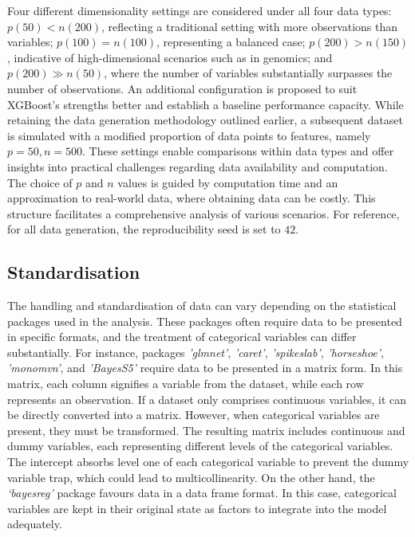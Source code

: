 \documentclass[
  11pt,
]{article}
\begin{document}
\hfill\break

Four different dimensionality settings are considered under all four
data types: \(p(50) < n(200)\), reflecting a traditional setting with
more observations than variables; \(p(100) = n(100)\), representing a
balanced case; \(p(200) > n(150)\), indicative of high-dimensional
scenarios such as in genomics; and \(p(200) \gg n(50)\), where the
number of variables substantially surpasses the number of observations.
An additional configuration is proposed to suit XGBoost's strengths
better and establish a baseline performance capacity. While retaining
the data generation methodology outlined earlier, a subsequent dataset
is simulated with a modified proportion of data points to features,
namely \(p=50, n=500\). These settings enable comparisons within data
types and offer insights into practical challenges regarding data
availability and computation. The choice of \(p\) and \(n\) values is
guided by computation time and an approximation to real-world data,
where obtaining data can be costly. This structure facilitates a
comprehensive analysis of various scenarios. For reference, for all data
generation, the reproducibility seed is set to \(42\).

\subsection{Standardisation}

The handling and standardisation of data can vary depending on the
statistical packages used in the analysis. These packages often require
data to be presented in specific formats, and the treatment of
categorical variables can differ substantially. For instance, packages
\emph{'glmnet'}, \emph{'caret'}, \emph{'spikeslab'}, \emph{'horseshoe'},
\emph{'monomvn'}, and \emph{'BayesS5'} require data to be presented in a
matrix form. In this matrix, each column signifies a variable from the
dataset, while each row represents an observation. If a dataset only
comprises continuous variables, it can be directly converted into a
matrix. However, when categorical variables are present, they must be
transformed. The resulting matrix includes continuous and dummy
variables, each representing different levels of the categorical
variables. The intercept absorbs level one of each categorical variable
to prevent the dummy variable trap, which could lead to
multicollinearity. On the other hand, the \emph{`bayesreg'} package
favours data in a data frame format. In this case, categorical variables
are kept in their original state as factors to integrate into the model
adequately.
\end{document}

